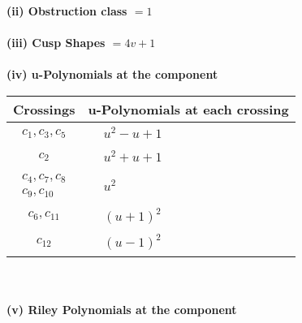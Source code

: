 \documentclass[1p]{elsarticle_modified}
\theoremstyle{definition}
\begin{document}
\flushleft \textbf{(ii) Obstruction class $= 1$}\\~\\
\flushleft \textbf{(iii) Cusp Shapes $= 4 v+1$}\\~\\
\newpage\renewcommand{\arraystretch}{1}
\flushleft \textbf{(iv) u-Polynomials at the component}\newline \\
\begin{tabular}{m{50pt}|m{274pt}}
Crossings & \hspace{64pt}u-Polynomials at each crossing \\
\hline $$\begin{aligned}c_{1},c_{3},c_{5}\end{aligned}$$&$\begin{aligned}
&u^2- u+1
\end{aligned}$\\
\hline $$\begin{aligned}c_{2}\end{aligned}$$&$\begin{aligned}
&u^2+u+1
\end{aligned}$\\
\hline $$\begin{aligned}c_{4},c_{7},c_{8}\\c_{9},c_{10}\end{aligned}$$&$\begin{aligned}
&u^2
\end{aligned}$\\
\hline $$\begin{aligned}c_{6},c_{11}\end{aligned}$$&$\begin{aligned}
&(u+1)^2
\end{aligned}$\\
\hline $$\begin{aligned}c_{12}\end{aligned}$$&$\begin{aligned}
&(u-1)^2
\end{aligned}$\\
\hline
\end{tabular}\\~\\
\newpage\renewcommand{\arraystretch}{1}
\flushleft \textbf{(v) Riley Polynomials at the component}\newline \\
\end{document}
